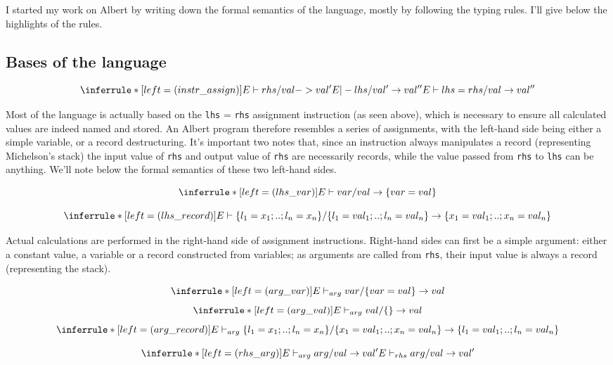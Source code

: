 \documentclass{report}
\begin{document}
I started my work on Albert by writing down the formal semantics of the language, mostly by following the typing rules. I'll give below the highlights of the rules.

\subsection{Bases of the language}

$$
\inferrule* [left=(instr\_assign)]
    { E \vdash rhs / val -> val' \\ E |- lhs / val' \rightarrow val'' }
    { E \vdash lhs = rhs / val \rightarrow val'' }
$$

Most of the language is actually based on the \texttt{lhs} = \texttt{rhs} assignment instruction (as seen above), which is necessary to ensure all calculated values are indeed named and stored. An Albert program therefore resembles a series of assignments, with the left-hand side being either a simple variable, or a record destructuring. It's important two notes that, since an instruction always manipulates a record (representing Michelson's stack) the input value of \lstinline{rhs} and output value of \lstinline{rhs} are necessarily records, while the value passed from \lstinline{rhs} to \lstinline{lhs} can be anything. We'll note below the formal semantics of these two left-hand sides.

$$
\inferrule* [left=(lhs\_var)]
    { }
    { E \vdash var / val \rightarrow \{ var = val \} }
$$

$$
\inferrule* [left=(lhs\_record)]
    { }
    { E \vdash \{ l_1 = x_1 ; .. ; l_n = x_n \} / \{ l_1 = val_1 ; .. ; l_n = val_n \} \rightarrow \{ x_1 = val_1 ; .. ; x_n = val_n \} }
$$

    Actual calculations are performed in the right-hand side of assignment instructions. Right-hand sides can first be a simple argument: either a constant value, a variable or a record constructed from variables; as arguments are called from \lstinline{rhs}, their input value is always a record (representing the stack).

$$
\inferrule* [left=(arg\_var)]
    { }
    { E \vdash_{arg} var / \{ var = val \} \rightarrow val }
$$
$$
\inferrule* [left=(arg\_val)]
    { }
    { E \vdash_{arg} val / \{\} \rightarrow val }
$$
$$
\inferrule* [left=(arg\_record)]
    { }
    { E \vdash_{arg} \{ l_1 = x_1 ; .. ; l_n = x_n \} / \{ x_1 = val_1 ; .. ; x_n = val_n \} \rightarrow \{ l_1 = val_1 ; .. ; l_n = val_n \} }
$$

$$
\inferrule* [left=(rhs\_arg)]
    { E \vdash_{arg} arg / val \rightarrow val' }
    { E \vdash_{rhs} arg / val \rightarrow val' }
$$
\end{document}
